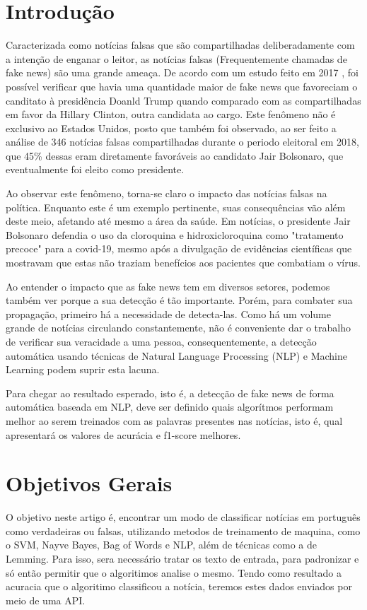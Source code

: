 \documentclass[conference]{IEEEtran}
\begin{document}
\section{Introdução}
Caracterizada como notícias falsas que são compartilhadas deliberadamente com a intenção de enganar o leitor, as notícias falsas (Frequentemente chamadas de fake news) são uma grande ameaça. De acordo com um estudo feito em 2017 \cite{b1}, foi possível verificar que havia uma quantidade maior de fake news que favoreciam o canditato à presidência Doanld Trump quando comparado com as compartilhadas em favor da Hillary Clinton, outra candidata ao cargo. Este fenômeno não é exclusivo ao Estados Unidos, posto que também foi observado, ao ser feito a análise de 346 notícias falsas \cite{b2} compartilhadas durante o periodo eleitoral em 2018, que 45\% dessas eram diretamente favoráveis ao candidato Jair Bolsonaro, que eventualmente foi eleito como presidente.

Ao observar este fenômeno, torna-se claro o impacto das notícias falsas na política. Enquanto este é um exemplo pertinente, suas consequências vão além deste meio, afetando até mesmo a área da saúde. Em notícias, o presidente Jair Bolsonaro defendia o uso da cloroquina e hidroxicloroquina como "tratamento precoce" para a covid-19, mesmo após a divulgação de evidências científicas que mostravam que estas não traziam benefícios aos pacientes que combatiam o vírus.

Ao entender o impacto que as fake news tem em diversos setores, podemos também ver porque a sua detecção é tão importante. Porém, para combater sua propagação, primeiro há a necessidade de detecta-las. Como há um volume grande de notícias circulando constantemente, não é conveniente dar o trabalho de verificar sua veracidade a uma pessoa, consequentemente, a detecção automática usando técnicas de Natural Language Processing (NLP) e Machine Learning podem suprir esta lacuna.

Para chegar ao resultado esperado, isto é, a detecção de fake news de forma automática baseada em NLP, deve ser definido quais algorítmos performam melhor ao serem treinados com as palavras presentes nas notícias, isto é, qual apresentará os valores de acurácia e f1-score melhores.

\section{Objetivos Gerais}
O objetivo neste artigo é, encontrar um modo de classificar notícias em português como verdadeiras ou falsas, utilizando metodos de treinamento de maquina, como o SVM, Nayve Bayes, Bag of Words e NLP, além de técnicas como a de Lemming.
Para isso, sera necessário tratar os texto de entrada, para padronizar e só então permitir que o algoritimos analise o mesmo.
Tendo como resultado a acuracia que o algoritimo classificou a notícia, teremos estes dados enviados por meio de uma API. 
\end{document}
